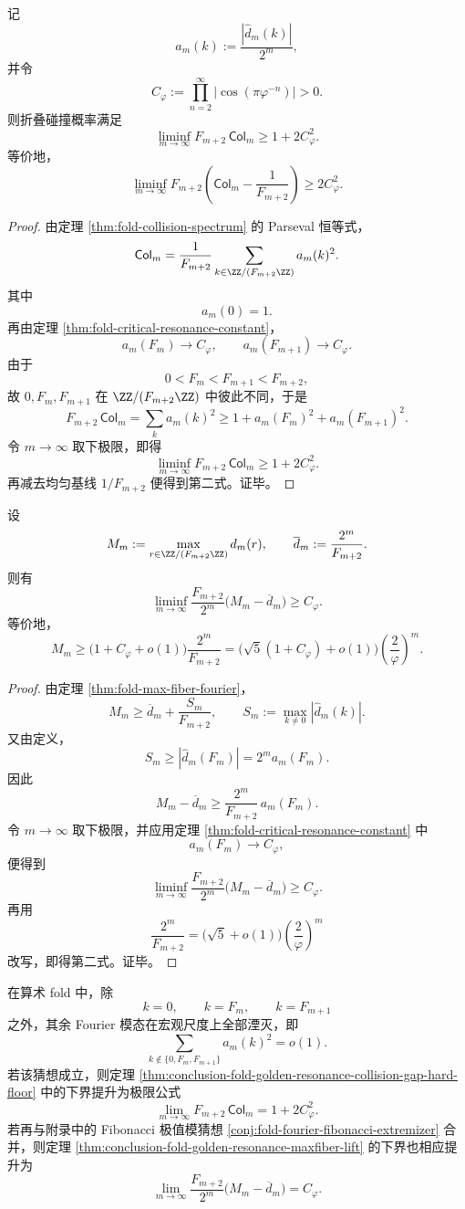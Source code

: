 \begin{theorem}[黄金共振导致的碰撞缺口硬下界]\label{thm:conclusion-fold-golden-resonance-collision-gap-hard-floor}
记
\[
a_m(k):=\frac{|\widehat d_m(k)|}{2^m},
\]
并令
\[
C_\varphi:=\prod_{n=2}^{\infty}\bigl|\cos(\pi\varphi^{-n})\bigr|>0.
\]
则折叠碰撞概率满足
\[
\liminf_{m\to\infty}F_{m+2}\,\mathsf{Col}_m
\ge
1+2C_\varphi^2.
\]
等价地，
\[
\liminf_{m\to\infty}
F_{m+2}\left(\mathsf{Col}_m-\frac{1}{F_{m+2}}\right)
\ge
2C_\varphi^2.
\]
\end{theorem}
\begin{proof}
由定理 \ref{thm:fold-collision-spectrum} 的 Parseval 恒等式，
\[
\mathsf{Col}_m=\frac{1}{F_{m+2}}\sum_{k\in \ZZ/(F_{m+2}\ZZ)}a_m(k)^2.
\]
其中
\[
a_m(0)=1.
\]
再由定理 \ref{thm:fold-critical-resonance-constant}，
\[
a_m(F_m)\longrightarrow C_\varphi,
\qquad
a_m(F_{m+1})\longrightarrow C_\varphi.
\]
由于
\[
0<F_m<F_{m+1}<F_{m+2},
\]
故 \(0,F_m,F_{m+1}\) 在 \(\ZZ/(F_{m+2}\ZZ)\) 中彼此不同，于是
\[
F_{m+2}\,\mathsf{Col}_m
=
\sum_k a_m(k)^2
\ge
1+a_m(F_m)^2+a_m(F_{m+1})^2.
\]
令 \(m\to\infty\) 取下极限，即得
\[
\liminf_{m\to\infty}F_{m+2}\,\mathsf{Col}_m
\ge
1+2C_\varphi^2.
\]
再减去均匀基线 \(1/F_{m+2}\) 便得到第二式。证毕。
\end{proof}

\begin{theorem}[极大纤维的黄金共振抬升]\label{thm:conclusion-fold-golden-resonance-maxfiber-lift}
设
\[
M_m:=\max_{r\in \ZZ/(F_{m+2}\ZZ)} d_m(r),
\qquad
\overline d_m:=\frac{2^m}{F_{m+2}}.
\]
则有
\[
\liminf_{m\to\infty}\frac{F_{m+2}}{2^m}\bigl(M_m-\overline d_m\bigr)\ge C_\varphi.
\]
等价地，
\[
M_m
\ge
\bigl(1+C_\varphi+o(1)\bigr)\frac{2^m}{F_{m+2}}
=
\bigl(\sqrt5(1+C_\varphi)+o(1)\bigr)\left(\frac{2}{\varphi}\right)^m.
\]
\end{theorem}
\begin{proof}
由定理 \ref{thm:fold-max-fiber-fourier}，
\[
M_m\ge \overline d_m+\frac{S_m}{F_{m+2}},
\qquad
S_m:=\max_{k\ne 0}|\widehat d_m(k)|.
\]
又由定义，
\[
S_m\ge |\widehat d_m(F_m)|=2^m a_m(F_m).
\]
因此
\[
M_m-\overline d_m
\ge
\frac{2^m}{F_{m+2}}\,a_m(F_m).
\]
令 \(m\to\infty\) 取下极限，并应用定理 \ref{thm:fold-critical-resonance-constant} 中
\[
a_m(F_m)\to C_\varphi,
\]
便得到
\[
\liminf_{m\to\infty}\frac{F_{m+2}}{2^m}\bigl(M_m-\overline d_m\bigr)\ge C_\varphi.
\]
再用
\[
\frac{2^m}{F_{m+2}}=\bigl(\sqrt5+o(1)\bigr)\left(\frac{2}{\varphi}\right)^m
\]
改写，即得第二式。证毕。
\end{proof}

\begin{conjecture}[共振三模完备性]\label{conj:conclusion-fold-three-mode-completeness}
在算术 fold 中，除
\[
k=0,\qquad k=F_m,\qquad k=F_{m+1}
\]
之外，其余 Fourier 模态在宏观尺度上全部湮灭，即
\[
\sum_{k\notin\{0,F_m,F_{m+1}\}} a_m(k)^2=o(1).
\]
若该猜想成立，则定理 \ref{thm:conclusion-fold-golden-resonance-collision-gap-hard-floor} 中的下界提升为极限公式
\[
\lim_{m\to\infty}F_{m+2}\,\mathsf{Col}_m
=
1+2C_\varphi^2.
\]
若再与附录中的 Fibonacci 极值模猜想 \ref{conj:fold-fourier-fibonacci-extremizer} 合并，则定理 \ref{thm:conclusion-fold-golden-resonance-maxfiber-lift} 的下界也相应提升为
\[
\lim_{m\to\infty}\frac{F_{m+2}}{2^m}\bigl(M_m-\overline d_m\bigr)
=
C_\varphi.
\]
\end{conjecture}

